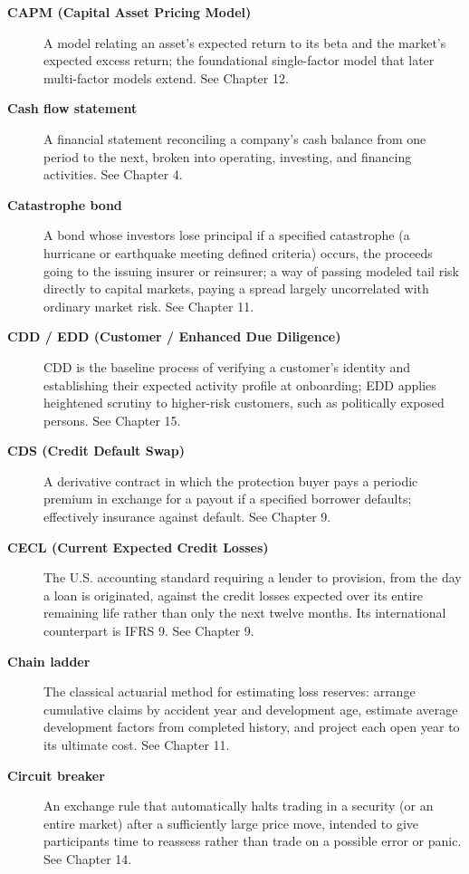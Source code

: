\documentclass[../ai_in_finance]{subfiles}
\begin{document}
\begin{description}
\item[\textbf{CAPM (Capital Asset Pricing Model)}] A model relating an asset's expected return to its beta and the market's expected excess return; the foundational single-factor model that later multi-factor models extend. See Chapter 12.

\item[\textbf{Cash flow statement}] A financial statement reconciling a company's cash balance from one period to the next, broken into operating, investing, and financing activities. See Chapter 4.

\item[\textbf{Catastrophe bond}] A bond whose investors lose principal if a specified catastrophe (a hurricane or earthquake meeting defined criteria) occurs, the proceeds going to the issuing insurer or reinsurer; a way of passing modeled tail risk directly to capital markets, paying a spread largely uncorrelated with ordinary market risk. See Chapter 11.

\item[\textbf{CDD / EDD (Customer / Enhanced Due Diligence)}] CDD is the baseline process of verifying a customer's identity and establishing their expected activity profile at onboarding; EDD applies heightened scrutiny to higher-risk customers, such as politically exposed persons. See Chapter 15.

\item[\textbf{CDS (Credit Default Swap)}] A derivative contract in which the protection buyer pays a periodic premium in exchange for a payout if a specified borrower defaults; effectively insurance against default. See Chapter 9.

\item[\textbf{CECL (Current Expected Credit Losses)}] The U.S. accounting standard requiring a lender to provision, from the day a loan is originated, against the credit losses expected over its entire remaining life rather than only the next twelve months. Its international counterpart is IFRS 9. See Chapter 9.
\item[\textbf{Chain ladder}] The classical actuarial method for estimating loss reserves: arrange cumulative claims by accident year and development age, estimate average development factors from completed history, and project each open year to its ultimate cost. See Chapter 11.

\item[\textbf{Circuit breaker}] An exchange rule that automatically halts trading in a security (or an entire market) after a sufficiently large price move, intended to give participants time to reassess rather than trade on a possible error or panic. See Chapter 14.


\end{description}
\end{document}
